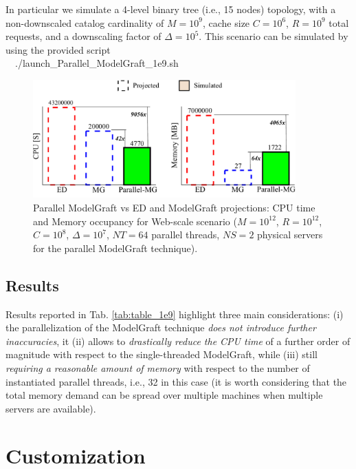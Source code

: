 \documentclass[10pt]{article}
\newcommand{\colorboxg}[1]{{\colorbox{gray!20}{#1}}}
\begin{document}
In particular we simulate a 4-level binary tree (i.e., 15 nodes) topology, with a non-downscaled catalog cardinality of $M=10^9$, cache size $C=10^6$, $R=10^9$ total requests, and a downscaling factor of $\Delta=10^5$. This scenario can be simulated by using the provided script \\
\ \ \colorboxg{./launch\_Parallel\_ModelGraft\_1e9.sh} 

\begin{figure}[t] 
  \centering
    \includegraphics[width=0.9\textwidth]{plot_cpu_mem_1e12_NEW.pdf}
  \caption{Parallel ModelGraft vs ED and ModelGraft projections: CPU time and Memory occupancy for Web-scale scenario ($M=10^{12}$, $R=10^{12}$, $C=10^8$, $\Delta=10^7$, $NT=64$ parallel threads, $NS=2$ physical servers for the parallel ModelGraft technique).}
  \label{fig:cpu_mem_1e12}
\end{figure}

\subsection*{Results}
Results reported in Tab. \ref{tab:table_1e9} highlight three main considerations: (i) the parallelization of the ModelGraft technique \emph{does not introduce further inaccuracies}, it (ii) allows to \emph{drastically reduce the CPU time} of a further order of magnitude with respect to the single-threaded ModelGraft, while (iii) still \emph{requiring a reasonable amount of memory} with respect to the number of instantiated parallel threads, i.e., 32 in this case (it is worth considering that the total memory demand can be spread over multiple machines when multiple servers are available).   


\section*{Customization}
\end{document}
